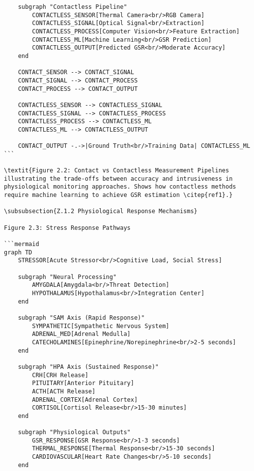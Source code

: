 \begin{verbatim}
    subgraph "Contactless Pipeline"
        CONTACTLESS_SENSOR[Thermal Camera<br/>RGB Camera]
        CONTACTLESS_SIGNAL[Optical Signal<br/>Extraction]
        CONTACTLESS_PROCESS[Computer Vision<br/>Feature Extraction]
        CONTACTLESS_ML[Machine Learning<br/>GSR Prediction]
        CONTACTLESS_OUTPUT[Predicted GSR<br/>Moderate Accuracy]
    end

    CONTACT_SENSOR --> CONTACT_SIGNAL
    CONTACT_SIGNAL --> CONTACT_PROCESS
    CONTACT_PROCESS --> CONTACT_OUTPUT

    CONTACTLESS_SENSOR --> CONTACTLESS_SIGNAL
    CONTACTLESS_SIGNAL --> CONTACTLESS_PROCESS
    CONTACTLESS_PROCESS --> CONTACTLESS_ML
    CONTACTLESS_ML --> CONTACTLESS_OUTPUT

    CONTACT_OUTPUT -.->|Ground Truth<br/>Training Data| CONTACTLESS_ML
```

\textit{Figure 2.2: Contact vs Contactless Measurement Pipelines illustrating the trade-offs between accuracy and intrusiveness in physiological monitoring approaches. Shows how contactless methods require machine learning to achieve GSR estimation \citep{ref1}.}

\subsubsection{Z.1.2 Physiological Response Mechanisms}

Figure 2.3: Stress Response Pathways

```mermaid
graph TD
    STRESSOR[Acute Stressor<br/>Cognitive Load, Social Stress]

    subgraph "Neural Processing"
        AMYGDALA[Amygdala<br/>Threat Detection]
        HYPOTHALAMUS[Hypothalamus<br/>Integration Center]
    end

    subgraph "SAM Axis (Rapid Response)"
        SYMPATHETIC[Sympathetic Nervous System]
        ADRENAL_MED[Adrenal Medulla]
        CATECHOLAMINES[Epinephrine/Norepinephrine<br/>2-5 seconds]
    end

    subgraph "HPA Axis (Sustained Response)"
        CRH[CRH Release]
        PITUITARY[Anterior Pituitary]
        ACTH[ACTH Release]
        ADRENAL_CORTEX[Adrenal Cortex]
        CORTISOL[Cortisol Release<br/>15-30 minutes]
    end

    subgraph "Physiological Outputs"
        GSR_RESPONSE[GSR Response<br/>1-3 seconds]
        THERMAL_RESPONSE[Thermal Response<br/>15-30 seconds]
        CARDIOVASCULAR[Heart Rate Changes<br/>5-10 seconds]
    end


\end{verbatim}
